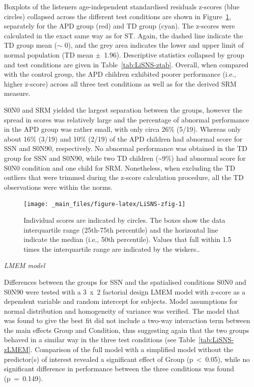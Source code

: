 \documentclass[a4paper, twoside]{templates/ociamthesis}
\begin{document}
Boxplots of the listeners age-independent standardised residuals z-scores (blue circles) collapsed across the different test conditions are shown in Figure~\ref{fig:LiSNS-zfig}, separately for the APD group (red) and TD group (cyan). The z-scores were calculated in the exact same way as for ST. Again, the dashed line indicate the TD group mean (\(\sim\) 0), and the grey area indicates the lower and upper limit of normal population (TD mean \(\pm\)~1.96). Descriptive statistics collapsed by group and test conditions are given in Table~\ref{tab:LiSNS-ztab}. Overall, when compared with the control group, the APD children exhibited poorer performance (i.e., higher z-score) across all three test conditions as well as for the derived SRM measure.

S0N0 and SRM yielded the largest separation between the groups, however the spread in scores was relatively large and the percentage of abnormal performance in the APD group was rather small, with only circa 26\% (5/19). Whereas only about 16\% (3/19) and 10\% (2/19) of the APD children had abnormal score for SSN and S0N90, respectively. No abnormal performance was obtained in the TD group for SSN and S0N90, while two TD children (\textasciitilde9\%) had abnormal score for S0N0 condition and one child for SRM. Nonetheless, when excluding the TD outliers that were trimmed during the z-score calculation procedure, all the TD observations were within the norms.

\begin{figure}

{\centering \texttt{[image: \_main\_files/figure-latex/LiSNS-zfig-1]} 

}

\caption{Individual scores are indicated by circles. The boxes show the data interquartile range (25th-75th percentile) and the horizontal line indicate the median (i.e., 50th percentile). Values that fall within 1.5 times the interquartile range are indicated by the wiskers..}\label{fig:LiSNS-zfig}
\end{figure}

\colorbox[HTML]{CCCCFF}{\emph{LMEM model}}

Differences between the groups for SSN and the spatialised conditions S0N0 and S0N90 were tested with a 3~x~2 factorial design LMEM model with z-score as a dependent variable and random intercept for subjects. Model assumptions for normal distribution and homogeneity of variance was verified. The model that was found to give the best fit did not include a two-way interaction term between the main effects Group and Condition, thus suggesting again that the two groups behaved in a similar way in the three test conditions (see Table~\ref{tab:LiSNS-zLMEM}. Comparison of the full model with a simplified model without the predictor(s) of interest revealed a significant effect of Group (p~\textless~0.05), while no significant difference in performance between the three conditions was found (p~=~0.149).
\end{document}
